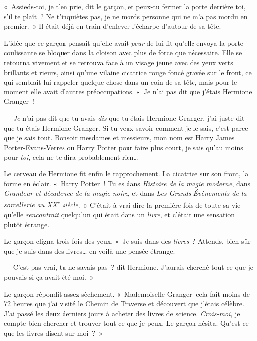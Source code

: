 «~Assieds-toi, je t'en prie, dit le garçon, et peux-tu fermer la porte derrière toi, s'il te plaît~?
Ne t'inquiètes pas, je ne mords personne qui ne m'a pas mordu en premier.~»
Il était déjà en train d'enlever l'écharpe d'autour de sa tête.

L'idée que ce garçon pensait qu'elle avait \emph{peur} de lui fit qu'elle envoya la porte coulissante se bloquer dans la cloison avec plus de force que nécessaire.
Elle se retourna vivement et se retrouva face à un visage jeune avec des yeux verts brillants et rieurs, ainsi qu'une vilaine cicatrice rouge foncé gravée sur le front, ce qui semblait lui rappeler quelque chose dans un coin de sa tête, mais pour le moment elle avait d'autres préoccupations.
«~Je n'ai pas dit que j'étais Hermione Granger~!

--- \emph{Je} n'ai pas dit que tu avais \emph{dis} que tu étais Hermione Granger, j'ai juste dit que tu étais Hermione Granger.
Si tu veux savoir comment je le sais, c'est parce que je sais tout.
Bonsoir mesdames et messieurs, mon nom est Harry James Potter-Evans-Verres ou Harry Potter pour faire plus court, je sais qu'au moins pour \emph{toi}, cela ne te dira probablement rien…

Le cerveau de Hermione fit enfin le rapprochement.
La cicatrice sur son front, la forme en éclair.
«~Harry Potter~!  Tu es dans \emph{Histoire de la magie moderne}, dans \emph{Grandeur et décadence de la magie noire}, et dans \emph{Les Grands Évènements de la sorcellerie au XX\textsuperscript{e} siècle}.~»
C'était à vrai dire la première fois de toute sa vie qu'elle \emph{rencontrait} quelqu'un qui était dans un \emph{livre}, et c'était une sensation plutôt étrange.

Le garçon cligna trois fois des yeux.
«~Je suis dans des \emph{livres}~? Attends, bien sûr que je suis dans des livres… en voilà une pensée étrange.

--- C'est pas vrai, tu ne savais pas~? dit Hermione. J'aurais cherché tout ce que je pouvais si ça avait été moi.~»

Le garçon répondit assez sèchement. «~Mademoiselle Granger, cela fait moins de 72 heures que j'ai visité le Chemin de Traverse et découvert que j'étais célèbre.
J'ai passé les deux derniers jours à acheter des livres de science.
\emph{Crois-moi}, je compte bien chercher et trouver tout ce que je peux.
Le garçon hésita.
Qu'est-ce que les livres disent sur moi~?~»

